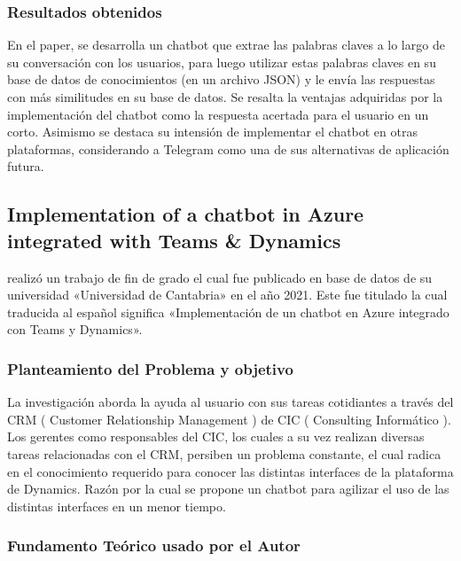 \subsubsection{Resultados obtenidos}
En el paper, se desarrolla un chatbot que extrae las palabras claves a lo largo de su conversación con los usuarios, para luego utilizar estas palabras claves en su base de datos de conocimientos (en un archivo JSON) y le envía las respuestas con más similitudes en su base de datos. 
Se resalta la ventajas adquiridas por la implementación del chatbot como la respuesta acertada para el usuario en un corto. Asimismo se destaca su intensión de implementar el chatbot en otras plataformas, considerando a Telegram como una de sus alternativas de aplicación futura.

\subsection{Implementation of a chatbot in Azure
integrated with Teams \& Dynamics  \citep*{ts_ICAITD}}

\citeauthor{ts_ICAITD} realizó un trabajo de fin de grado el cual fue publicado en base de datos de su universidad «Universidad de Cantabria» en el año 2021. 
Este fue titulado  la cual traducida al español significa «Implementación de un chatbot en Azure
integrado con Teams y Dynamics».

\subsubsection{Planteamiento del Problema y objetivo }
La investigación aborda la ayuda al usuario con sus tareas cotidiantes a través del CRM ( Customer Relationship Management ) de CIC ( Consulting Informático ). 
Los gerentes como responsables del CIC, los cuales a su vez realizan diversas tareas relacionadas con el CRM, persiben un problema constante, el cual radica en el conocimiento requerido para conocer las distintas interfaces de la plataforma de Dynamics. Razón por la cual se propone un chatbot para agilizar el uso de las distintas interfaces en un menor tiempo.

\subsubsection{Fundamento Teórico usado por el Autor}

